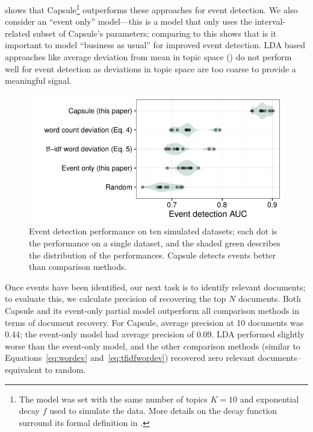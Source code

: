  shows that Capsule\footnote{The model was set with the same number of topics $K=10$ and exponential decay $f$ used to simulate the data.  More details on the decay function surround its formal definition in .} outperforms these approaches for event detection.  We also consider an ``event only'' model---this is a model that only uses the interval-related subset of Capsule's parameters; comparing to this shows that is it important to model ``business as usual'' for improved event detection.  LDA based approaches like average deviation from mean in topic space (\cite{dou2012leadline}) do not perform well for event detection as deviations in topic space are too coarse to provide a meaningful signal.

\begin{figure}[ht]
\centering
\includegraphics[width=\linewidth]{fig/sim_eventdetect.pdf}
\caption{Event detection performance on ten simulated datasets; each dot is the performance on a single dataset, and the shaded green describes the distribution of the performances.  Capsule detects events better than comparison methods.}
\label{fig:sim_eventdetect}
\end{figure}

Once events have been identified, our next task is to identify relevant documents; to evaluate this, we calculate precision of recovering the top $N$ documents.  Both Capsule and its event-only partial model outperform all comparison methods in terms of document recovery.  For Capsule, average precision at 10 documents was 0.44; the event-only model had average precision of 0.09.  LDA performed slightly worse than the event-only model, and the other comparison methods (similar to Equations~\ref{eq:wordev} and~\ref{eq:tfidfwordev}) recovered zero relevant documents--equivalent to random.


